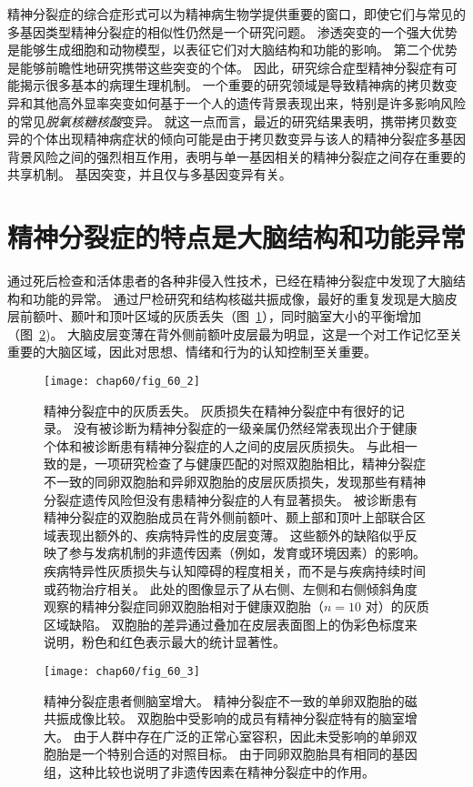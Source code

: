 精神分裂症的综合症形式可以为精神病生物学提供重要的窗口，即使它们与常见的多基因类型精神分裂症的相似性仍然是一个研究问题。
渗透突变的一个强大优势是能够生成细胞和动物模型，以表征它们对大脑结构和功能的影响。
第二个优势是能够前瞻性地研究携带这些突变的个体。
因此，研究综合症型精神分裂症有可能揭示很多基本的病理生理机制。
一个重要的研究领域是导致精神病的拷贝数变异和其他高外显率突变如何基于一个人的遗传背景表现出来，特别是许多影响风险的常见\textit{脱氧核糖核酸}变异。
就这一点而言，最近的研究结果表明，携带拷贝数变异的个体出现精神病症状的倾向可能是由于拷贝数变异与该人的精神分裂症多基因背景风险之间的强烈相互作用，表明与单一基因相关的精神分裂症之间存在重要的共享机制。
基因突变，并且仅与多基因变异有关。



\section{精神分裂症的特点是大脑结构和功能异常}

通过死后检查和活体患者的各种非侵入性技术，已经在精神分裂症中发现了大脑结构和功能的异常。
通过尸检研究和结构核磁共振成像，最好的重复发现是大脑皮层前额叶、颞叶和顶叶区域的灰质丢失（图~\ref{fig:60_2}），同时脑室大小的平衡增加（图~\ref{fig:60_3})。
大脑皮层变薄在背外侧前额叶皮层最为明显，这是一个对工作记忆至关重要的大脑区域，因此对思想、情绪和行为的认知控制至关重要。



\begin{figure}[htbp]
	\centering
	\texttt{[image: chap60/fig\_60\_2]}
	\caption{精神分裂症中的灰质丢失。
		灰质损失在精神分裂症中有很好的记录。
		没有被诊断为精神分裂症的一级亲属仍然经常表现出介于健康个体和被诊断患有精神分裂症的人之间的皮层灰质损失。
		与此相一致的是，一项研究检查了与健康匹配的对照双胞胎相比，精神分裂症不一致的同卵双胞胎和异卵双胞胎的皮层灰质损失，发现那些有精神分裂症遗传风险但没有患精神分裂症的人有显著损失。
		被诊断患有精神分裂症的双胞胎成员在背外侧前额叶、颞上部和顶叶上部联合区域表现出额外的、疾病特异性的皮层变薄。
		这些额外的缺陷似乎反映了参与发病机制的非遗传因素（例如，发育或环境因素）的影响。
		疾病特异性灰质损失与认知障碍的程度相关，而不是与疾病持续时间或药物治疗相关。
		此处的图像显示了从右侧、左侧和右侧倾斜角度观察的精神分裂症同卵双胞胎相对于健康双胞胎（$ n = 10 $ 对）的灰质区域缺陷。
		双胞胎的差异通过叠加在皮层表面图上的伪彩色标度来说明，粉色和红色表示最大的统计显著性\cite{cannon2002cortex}。}
	\label{fig:60_2}
\end{figure}


\begin{figure}[htbp]
	\centering
	\texttt{[image: chap60/fig\_60\_3]}
	\caption{精神分裂症患者侧脑室增大。
		精神分裂症不一致的单卵双胞胎的磁共振成像比较。
		双胞胎中受影响的成员有精神分裂症特有的脑室增大。
		由于人群中存在广泛的正常心室容积，因此未受影响的单卵双胞胎是一个特别合适的对照目标。
		由于同卵双胞胎具有相同的基因组，这种比较也说明了非遗传因素在精神分裂症中的作用。}
	\label{fig:60_3}
\end{figure}


